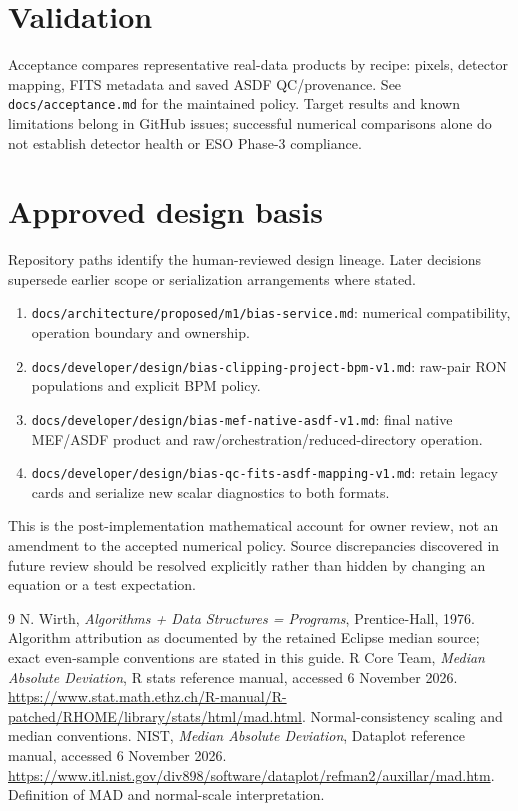 \documentclass[11pt,a4paper]{article}
\newcommand{\code}[1]{\nolinkurl{#1}}
\begin{document}
\section{Validation}
Acceptance compares representative real-data products by recipe: pixels,
detector mapping, FITS metadata and saved ASDF QC/provenance. See
\code{docs/acceptance.md} for the maintained policy. Target results and known
limitations belong in GitHub issues; successful numerical comparisons alone
do not establish detector health or ESO Phase-3 compliance.

\section{Approved design basis}\label{sec:authority}
Repository paths identify the human-reviewed design lineage. Later decisions
supersede earlier scope or serialization arrangements where stated.
\begin{enumerate}
\item \code{docs/architecture/proposed/m1/bias-service.md}: numerical
compatibility, operation boundary and ownership.
\item \code{docs/developer/design/bias-clipping-project-bpm-v1.md}:
raw-pair RON populations and explicit BPM policy.
\item \code{docs/developer/design/bias-mef-native-asdf-v1.md}: final native
MEF/ASDF product and raw/orchestration/reduced-directory operation.
\item \code{docs/developer/design/bias-qc-fits-asdf-mapping-v1.md}:
retain legacy cards and serialize new scalar diagnostics to both formats.
\end{enumerate}
This is the post-implementation mathematical account for owner review, not
an amendment to the accepted numerical policy. Source discrepancies discovered
in future review should be resolved explicitly rather than hidden by changing
an equation or a test expectation.

\begin{thebibliography}{9}
 N. Wirth, \emph{Algorithms + Data Structures = Programs},
Prentice-Hall, 1976. Algorithm attribution as documented by the retained
Eclipse median source; exact even-sample conventions are stated in this guide.
 R Core Team, \emph{Median Absolute Deviation}, R stats reference
manual, accessed 6 November 2026.
\url{https://www.stat.math.ethz.ch/R-manual/R-patched/RHOME/library/stats/html/mad.html}.
Normal-consistency scaling and median conventions.
 NIST, \emph{Median Absolute Deviation}, Dataplot reference
manual, accessed 6 November 2026.
\url{https://www.itl.nist.gov/div898/software/dataplot/refman2/auxillar/mad.htm}.
Definition of MAD and normal-scale interpretation.
\end{thebibliography}
\end{document}
